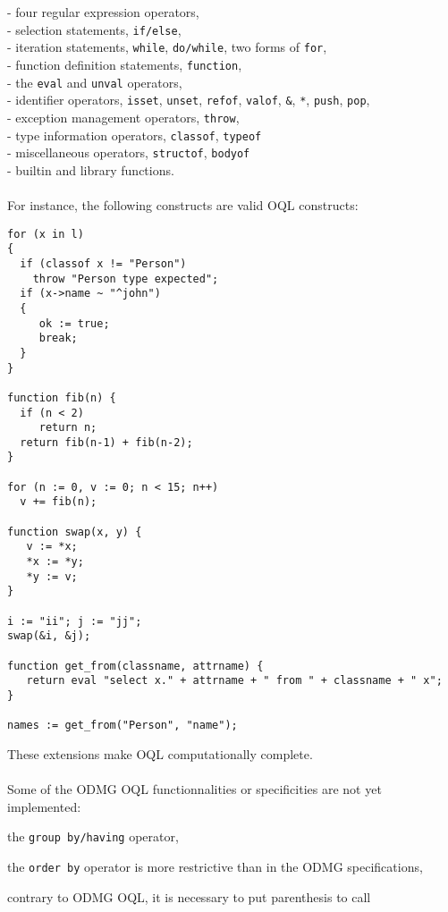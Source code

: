\ixy - four regular expression operators,\\
\ixy - selection statements, \texttt{if/else},\\
\ixy - iteration statements, \texttt{while}, \texttt{do/while}, two forms
of \texttt{for}, \\
\ixy - function definition statements, \texttt{function},\\
\ixy - the \texttt{eval} and \texttt{unval} operators,\\
\ixy - identifier operators, \texttt{isset}, \texttt{unset},
\texttt{refof}, \texttt{valof}, \texttt{\&}, \texttt{*}, \texttt{push},
\texttt{pop}, \\
\ixy - exception management operators, \texttt{throw},\\
\ixy - type information operators, \texttt{classof}, \texttt{typeof}\\
\ixy - miscellaneous operators, \texttt{structof}, \texttt{bodyof}\\
\ixy - builtin and library functions.\\
\\
For instance, the following constructs are valid OQL constructs:
\begin{verbatim}
for (x in l)
{
  if (classof x != "Person")
    throw "Person type expected";
  if (x->name ~ "^john")
  {
     ok := true;
     break;
  }
}

function fib(n) {
  if (n < 2)
     return n;
  return fib(n-1) + fib(n-2);
}

for (n := 0, v := 0; n < 15; n++)
  v += fib(n);

function swap(x, y) {
   v := *x;
   *x := *y;
   *y := v;
}

i := "ii"; j := "jj";
swap(&i, &j);

function get_from(classname, attrname) {
   return eval "select x." + attrname + " from " + classname + " x";
}

names := get_from("Person", "name");
\end{verbatim}
\normalsize
These extensions make OQL computationally complete. 
\\
\\
Some of the ODMG OQL functionnalities or specificities are not yet implemented:
\be
\item the \texttt{group by/having} operator,
\item the \texttt{order by} operator is more restrictive than in the
ODMG specifications,
\item contrary to ODMG OQL, it is necessary to put parenthesis to call
